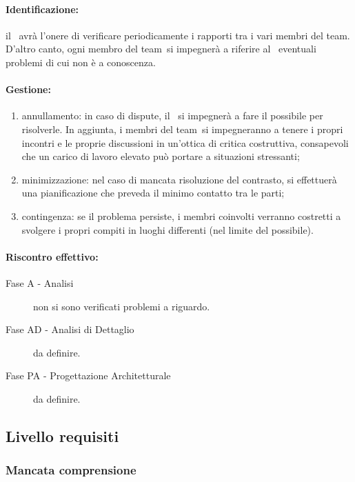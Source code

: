 \documentclass[../PianoProgetto.tex]{subfiles}
\begin{document}
	\paragraph*{Identificazione:} il \responsabilediprogetto\ avrà l'onere di verificare periodicamente i rapporti tra i vari membri del team\g. D'altro canto, ogni membro del team\g\ si impegnerà a riferire al \responsabilediprogetto\ eventuali problemi di cui non è a conoscenza.
	
	\paragraph*{Gestione:}
	\begin{enumerate}
		\item annullamento: in caso di dispute, il \responsabilediprogetto\ si impegnerà a fare il possibile per risolverle. In aggiunta, i membri del team\g\ si impegneranno a tenere i propri incontri e le proprie discussioni in un'ottica di critica costruttiva, consapevoli che un carico di lavoro elevato può portare a situazioni stressanti;
		\item minimizzazione: nel caso di mancata risoluzione del contrasto, si effettuerà una pianificazione che preveda il minimo contatto tra le parti; 
		\item contingenza: se il problema persiste, i membri coinvolti verranno costretti a svolgere i propri compiti in luoghi differenti (nel limite del possibile).
	\end{enumerate}	
	
	\paragraph*{Riscontro effettivo:}
		\begin{description}
			\item[Fase A - Analisi] non si sono verificati problemi a riguardo.
			\item[Fase AD - Analisi di Dettaglio] da definire.
			\item[Fase PA - Progettazione Architetturale] da definire.
		\end{description}

\subsection{Livello requisiti}

\subsubsection{Mancata comprensione}
\end{document}
